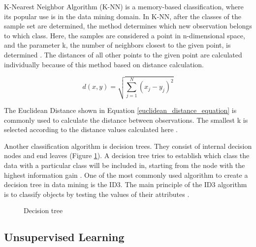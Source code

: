 K-Nearest Neighbor Algorithm (K-NN) is a memory-based classification, where its popular use is in the data mining domain. In K-NN, after the classes of the sample set are determined, the method determines which new observation belongs to which class. Here, the samples are considered a point in n-dimensional space, and the parameter k, the number of neighbors closest to the given point, is determined \cite{cover1967nearest}. The distances of all other points to the given point are calculated individually because of this method based on distance calculation. 

\begin{equation} \label{euclidean_distance_equation}
d(x,y) = \sqrt{\sum_{j=1}^{N}(x_j - y_j)^2}
\end{equation}

The Euclidean Distance shown in Equation \ref{euclidean_distance_equation} is commonly used to calculate the distance between observations. The smallest k is selected according to the distance values calculated here \cite{hall2008choice}.

Another classification algorithm is decision trees. They consist of internal decision nodes and end leaves (Figure \ref{fig:DecisionTreeExample}). A decision tree tries to establish which class the data with a particular class will be included in, starting from the node with the highest information gain \cite{hssina2014comparative}. One of the most commonly used algorithm to create a decision tree in data mining is the ID3. The main principle of the ID3 algorithm is to classify objects by testing the values of their attributes \cite{jin2009improved}.

\begin{figure}[htbp]
\centering
{}
\caption{Decision tree}
\label{fig:DecisionTreeExample}
\end{figure}

\subsection{Unsupervised Learning}


